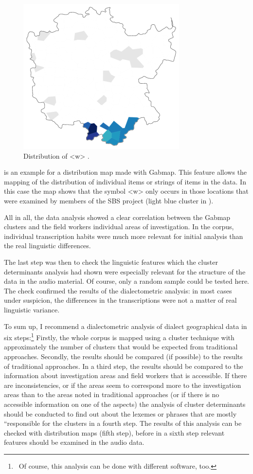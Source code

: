 \documentclass[output=paper]{LSP/langsci}
\begin{document}
\begin{figure}
\includegraphics[width=.5\textwidth]{illustrations/mathus_fig10}
\caption{Distribution of {\textless}w{\textgreater} \citep[226]{mathussek_sprachraume_2014}.}
\label{fig:10}
\end{figure}
  
 is an example for a distribution map made with Gabmap. This feature allows the mapping of the distribution of individual items or strings of items in the data. In this case the map shows that the symbol {\textless}w{\textgreater} only occurs in those locations that were examined by members of the SBS project (light blue cluster in ).

All in all, the data analysis showed a clear correlation between the Gabmap clusters and the field workers{\textquotesingle} individual areas of investigation. In the corpus, individual transcription habits were much more relevant for initial analysis than the real linguistic differences.

The last step was then to check the linguistic features which the cluster determinants analysis had shown were especially relevant for the structure of the data in the audio material. Of course, only a random sample could be tested here. The check confirmed the results of the dialectometric analysis: in most cases under suspicion, the differences in the transcriptions were not a matter of real linguistic variance.

To sum up, I recommend a dialectometric analysis of dialect geographical data in six steps:\footnote{\ Of course, this analysis can be done with different software, too.} Firstly, the whole corpus is mapped using a cluster technique with approximately the number of clusters that would be expected from traditional approaches. Secondly, the results should be compared (if possible) to the results of traditional approaches. In a third step, the results should be compared to the information about investigation areas and field workers that is accessible. If there are inconsistencies, or if the areas seem to correspond more to the investigation areas than to the areas noted in traditional approaches (or if there is no accessible information on one of the aspects) the analysis of cluster determinants should be conducted to find out about the lexemes or phrases that are mostly ``responsible{\textquotedbl} for the clusters in a fourth step. The results of this analysis can be checked with distribution maps (fifth step), before in a sixth step relevant features should be examined in the audio data.
\end{document}
